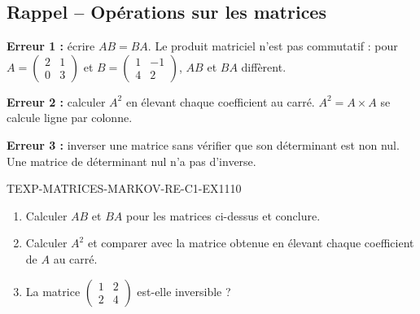 

\subsection*{Rappel -- Opérations sur les matrices}

\textbf{Erreur 1 :} écrire $AB=BA$. Le produit matriciel n'est pas
commutatif : pour $A=\begin{pmatrix}2&1\\0&3\end{pmatrix}$ et
$B=\begin{pmatrix}1&-1\\4&2\end{pmatrix}$, $AB$ et $BA$ diffèrent.

\textbf{Erreur 2 :} calculer $A^2$ en élevant chaque coefficient au carré.
$A^2=A\times A$ se calcule ligne par colonne.

\textbf{Erreur 3 :} inverser une matrice sans vérifier que son déterminant est
non nul. Une matrice de déterminant nul n'a pas d'inverse.


\begin{exercice}{TEXP-MATRICES-MARKOV-RE-C1-EX1}{1}{10}
\begin{enumerate}
  \item Calculer $AB$ et $BA$ pour les matrices ci-dessus et conclure.
  \item Calculer $A^2$ et comparer avec la matrice obtenue en élevant chaque
        coefficient de $A$ au carré.
  \item La matrice $\begin{pmatrix}1&2\\2&4\end{pmatrix}$ est-elle inversible ?
\end{enumerate}
\end{exercice}
